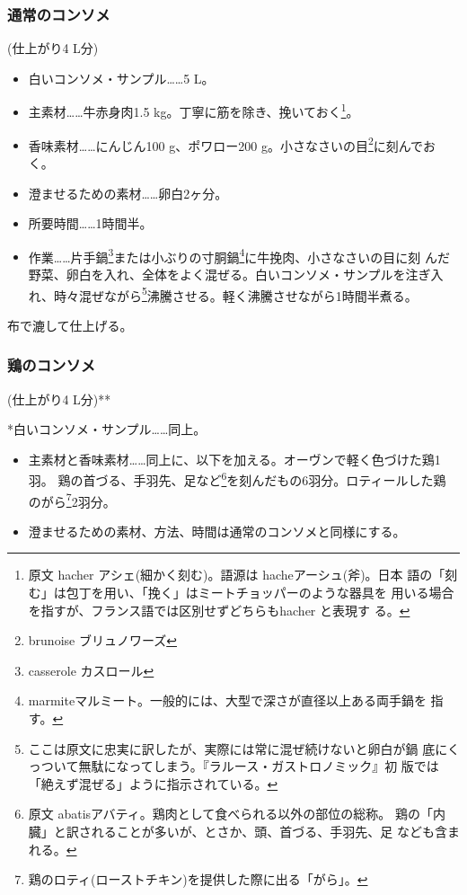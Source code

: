 \begin{recette}
\hypertarget{ux901aux5e38ux306eux30b3ux30f3ux30bdux30e1}{%
\subsubsection{通常のコンソメ}\label{ux901aux5e38ux306eux30b3ux30f3ux30bdux30e1}}

(仕上がり4 L分)

\begin{itemize}
\item
  白いコンソメ・サンプル\ldots{}\ldots{}5 L。
\item
  主素材\ldots{}\ldots{}牛赤身肉1.5
  kg。丁寧に筋を除き、挽いておく\footnote{原文 hacher
    アシェ(細かく刻む)。語源は hacheアーシュ(斧)。日本
    語の「刻む」は包丁を用い、「挽く」はミートチョッパーのような器具を
    用いる場合を指すが、フランス語では区別せずどちらもhacher と表現す
    る。}。
\item
  香味素材\ldots{}\ldots{}にんじん100 g、ポワロー200
  g。小さなさいの目\footnote{brunoise ブリュノワーズ}に刻んでおく。
\item
  澄ませるための素材\ldots{}\ldots{}卵白2ヶ分。
\item
  所要時間\ldots{}\ldots{}1時間半。
\item
  作業\ldots{}\ldots{}片手鍋\footnote{casserole カスロール}または小ぶりの寸胴鍋\footnote{marmiteマルミート。一般的には、大型で深さが直径以上ある両手鍋を
    指す。}に牛挽肉、小さなさいの目に刻
  んだ野菜、卵白を入れ、全体をよく混ぜる。白いコンソメ・サンプルを注ぎ入
  れ、時々混ぜながら\footnote{ここは原文に忠実に訳したが、実際には常に混ぜ続けないと卵白が鍋
    底にくっついて無駄になってしまう。『ラルース・ガストロノミック』初
    版では「絶えず混ぜる」ように指示されている。}沸騰させる。軽く沸騰させながら1時間半煮る。
\end{itemize}

布で漉して仕上げる。

\hypertarget{ux9d8fux306eux30b3ux30f3ux30bdux30e1}{%
\subsubsection{鶏のコンソメ}\label{ux9d8fux306eux30b3ux30f3ux30bdux30e1}}

(仕上がり4 L分)**

*白いコンソメ・サンプル\ldots{}\ldots{}同上。

\begin{itemize}
\item
  主素材と香味素材\ldots{}\ldots{}同上に、以下を加える。オーヴンで軽く色づけた鶏1羽。
  鶏の首づる、手羽先、足など\footnote{原文
    abatisアバティ。鶏肉として食べられる以外の部位の総称。
    鶏の「内臓」と訳されることが多いが、とさか、頭、首づる、手羽先、足
    なども含まれる。}を刻んだもの6羽分。ロティールした鶏
  のがら\footnote{鶏のロティ(ローストチキン)を提供した際に出る「がら」。}2羽分。
\item
  澄ませるための素材、方法、時間は通常のコンソメと同様にする。
\end{itemize}
\end{recette}